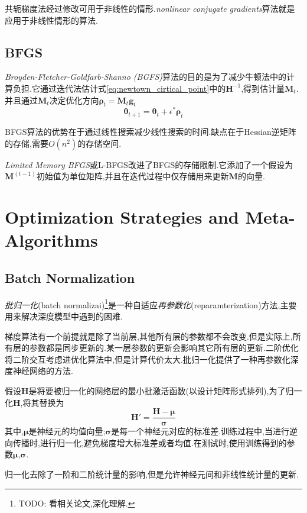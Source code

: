 共轭梯度法经过修改可用于非线性的情形.\textit{nonlinear conjugate gradients}算法就是应用于非线性情形的算法.

\subsection{BFGS}

\textit{Broyden-Fletcher-Goldfarb-Shanno (BGFS)}算法的目的是为了减少牛顿法中的计算负担.它通过迭代法估计式\ref{eq:newtown_cirtical_point}中的$\bm H^{-1}$,得到估计量$\bm M_t$.并且通过$\bm M_t$决定优化方向$\bm\rho_t=\bm M_t\bm g_t$
\begin{equation}
\bm\theta_{t+1}=\bm\theta_t+\epsilon^\ast\bm\rho_t
\end{equation}

BFGS算法的优势在于通过线性搜索减少线性搜索的时间.缺点在于Hessian逆矩阵的存储,需要$O(n^2)$的存储空间.

\textit{Limited Memory BFGS}或L-BFGS改进了BFGS的存储限制.它添加了一个假设为$\bm M^{(t-1)}$初始值为单位矩阵,并且在迭代过程中仅存储用来更新$\bm M$的向量.

\section{Optimization Strategies and Meta-Algorithms}

\subsection{Batch Normalization}

\textit{批归一化}(batch normalizai)\footnote{TODO: 看相关论文,深化理解.}是一种自适应\textit{再参数化}(reparamterization)方法,主要用来解决深度模型中遇到的困难.

梯度算法有一个前提就是除了当前层,其他所有层的参数都不会改变.但是实际上,所有层的参数都是同步更新的.某一层参数的更新会影响其它所有层的更新.二阶优化将二阶交互考虑进优化算法中,但是计算代价太大.批归一化提供了一种再参数化深度神经网络的方法.

假设$\bm H$是将要被归一化的网络层的最小批激活函数(以设计矩阵形式排列),为了归一化$\bm H$,将其替换为
\begin{equation}
\bm H'=\frac{\bm{H-\mu}}{\bm\sigma}
\end{equation}
其中,$\bm\mu$是神经元的均值向量;$\bm\sigma$是每一个神经元对应的标准差.训练过程中,当进行逆向传播时,进行归一化,避免梯度增大标准差或者均值.在测试时,使用训练得到的参数$\bm\mu$,$\bm\sigma$.

归一化去除了一阶和二阶统计量的影响,但是允许神经元间和非线性统计量的更新.

